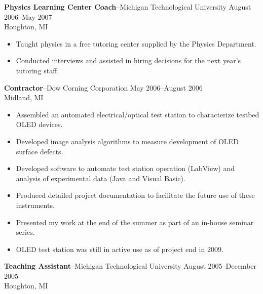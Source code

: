 \documentclass[10pt]{article}
\newcommand{\jobitem}[4]{
    \vspace{4pt}

    \textbf{#1}--#2 \hfill #3\\ #4

    \vspace{-8pt}
}
\begin{document}
\jobitem{Physics Learning Center Coach}{Michigan Technological University}{August 2006--May 2007}{Houghton, MI}
\begin{itemize}\setlength{\itemsep}{0cm}
  \setlength{\parskip}{0cm}
\item Taught physics in a free tutoring center supplied by the Physics Department.
\item Conducted interviews and assisted in hiring decisions for the next year's tutoring staff.
\end{itemize}

\jobitem{Contractor}{Dow Corning Corporation}{May 2006--August 2006}{Midland, MI}

\begin{itemize}\setlength{\itemsep}{0cm}
  \setlength{\parskip}{0cm}
\item Assembled an automated electrical/optical test station to characterize testbed OLED devices. 
\item Developed image analysis algorithms to measure development of OLED surface defects.
\item Developed software to automate test station operation (LabView) and analysis of experimental data (Java and Visual Basic).
\item Produced detailed project documentation to facilitate the future use of these instruments.
\item Presented my work at the end of the summer as part of an in-house seminar series.
\item OLED test station was still in active use as of project end in 2009.
\end{itemize}
%
\jobitem{Teaching Assistant}{Michigan Technological University}{August 2005--December 2005}{Houghton, MI}
\end{document}
